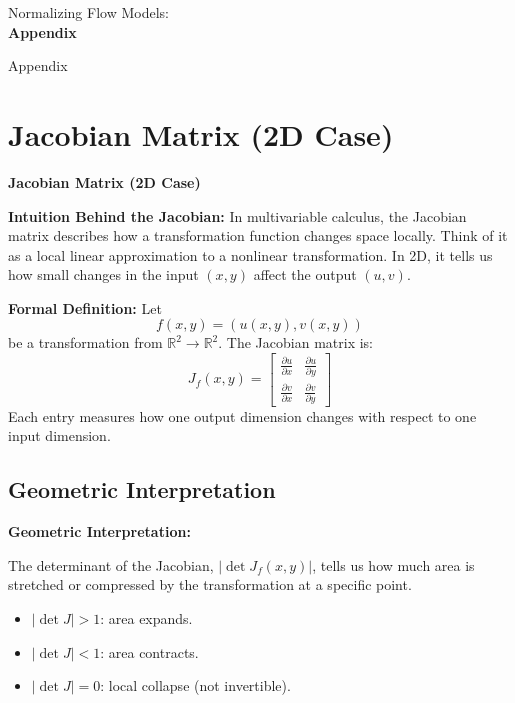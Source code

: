 \begin{frame}[allowframebreaks]{}
    \LARGE Normalizing Flow Models: \\[1.5ex] \textbf{Appendix}
\end{frame}

\begin{frame}[allowframebreaks]{Appendix}
    \section{Jacobian Matrix (2D Case)}
    \label{sec:appendix-jacobian-2d}

    \textbf{Jacobian Matrix (2D Case)}

    \textbf{Intuition Behind the Jacobian:} In multivariable calculus, the Jacobian matrix describes how a transformation function changes space locally. Think of it as a local linear approximation to a nonlinear transformation. In 2D, it tells us how small changes in the input $(x, y)$ affect the output $(u, v)$.

    \vspace{0.5em}
    \textbf{Formal Definition:} Let
    \[
    f(x, y) = (u(x, y), v(x, y))
    \]
    be a transformation from $\mathbb{R}^2 \to \mathbb{R}^2$. The Jacobian matrix is:
    \[
    J_f(x, y) =
    \begin{bmatrix}
    \frac{\partial u}{\partial x} & \frac{\partial u}{\partial y} \\
    \frac{\partial v}{\partial x} & \frac{\partial v}{\partial y}
    \end{bmatrix}
    \]
    Each entry measures how one output dimension changes with respect to one input dimension.

    \framebreak

    \subsection{Geometric Interpretation}
    \label{subsec:appendix-jacobian-geometry}
    \textbf{Geometric Interpretation:}

    The determinant of the Jacobian, $|\det J_f(x, y)|$, tells us how much area is stretched or compressed by the transformation at a specific point.

    \begin{itemize}
        \item $|\det J| > 1$: area expands.
        \item $|\det J| < 1$: area contracts.
        \item $|\det J| = 0$: local collapse (not invertible).
    \end{itemize}


\end{frame}
